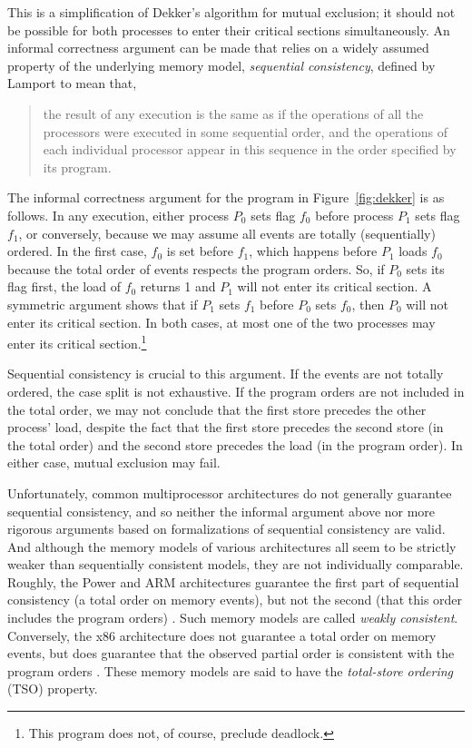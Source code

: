 \documentclass[11pt]{report}
\begin{document}
This is a simplification of Dekker's algorithm for mutual exclusion; it should not be possible for both processes to enter their critical sections simultaneously. An informal correctness argument can be made that relies on a widely assumed property of the underlying memory model, \emph{sequential consistency}, defined by Lamport \cite{DBLP:journals/tc/Lamport79} to mean that, \begin{quotation}\noindent the result of any execution is the same as if the operations of all the processors were executed in some sequential order, and the operations of each individual processor appear in this sequence in the order specified by its program. \end{quotation}

The informal correctness argument for the program in Figure~\ref{fig:dekker} is as follows. In any execution, either process $P_0$ sets flag $f_0$ before process $P_1$ sets flag $f_1$, or conversely, because we may assume all events are totally (sequentially) ordered. In the first case, $f_0$ is set before $f_1$, which happens before $P_1$ loads $f_0$ because the total order of events respects the program orders. So, if $P_0$ sets its flag first, the load of $f_0$ returns 1 and $P_1$ will not enter its critical section. A symmetric argument shows that if $P_1$ sets $f_1$ before $P_0$ sets $f_0$, then $P_0$ will not enter its critical section. In both cases, at most one of the two processes may enter its critical section.\footnote{This program does not, of course, preclude deadlock.}

Sequential consistency is crucial to this argument. If the events are not totally ordered, the case split is not exhaustive. If the program orders are not included in the total order, we may not conclude that the first store precedes the other process' load, despite the fact that the first store precedes the second store (in the total order) and the second store precedes the load (in the program order). In either case, mutual exclusion may fail.

Unfortunately, common multiprocessor architectures do not generally guarantee sequential consistency, and so neither the informal argument above nor more rigorous arguments based on formalizations of sequential consistency are valid. And although the memory models of various architectures all seem to be strictly weaker than sequentially consistent models, they are not individually comparable. Roughly, the Power and ARM architectures guarantee the first part of sequential consistency (a total order on memory events), but not the second (that this order includes the program orders) \cite{DBLP:conf/popl/2009damp,DBLP:conf/asplos/ChongI08}. Such memory models are called \emph{weakly consistent}. Conversely, the x86 architecture does not guarantee a total order on memory events, but does guarantee that the observed partial order is consistent with the program orders \cite{DBLP:conf/tphol/OwensSS09}. These memory models are said to have the \emph{total-store ordering} (TSO) property.
\end{document}

